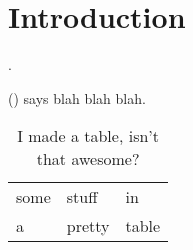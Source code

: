 %
%
\chapter{Introduction}
\label{chap:intro}


\blindtext \parencite{Duong2011}.

\citeauthor{Sitaram2011} (\citeyear{Sitaram2011}) says blah blah blah.

\begin{table}
\caption{I made a table, isn't that awesome?}
\begin{tabular}{lll}
some & stuff & in \\
a & pretty & table \\
\end{tabular}
\end{table}



\Blindtext[1][2]


